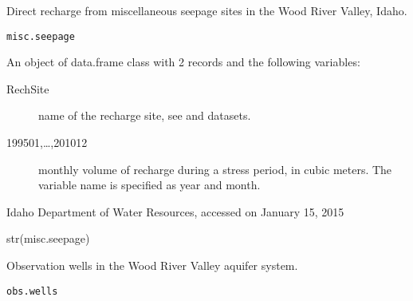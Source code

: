 \documentclass[a4paper]{book}
\begin{document}
%
\begin{Description}\relax
Direct recharge from miscellaneous seepage sites in the Wood River Valley, Idaho.
\end{Description}
%
\begin{Usage}
\begin{verbatim}
misc.seepage
\end{verbatim}
\end{Usage}
%
\begin{Format}
An object of data.frame class with 2 records and the following variables:
\begin{description}

\item[RechSite] name of the recharge site, see  and
 datasets.
\item[199501,\dots,201012] monthly volume of recharge during a stress period, in cubic meters.
The variable name is specified as year and month.

\end{description}
\end{Format}
%
\begin{Source}\relax
Idaho Department of Water Resources, accessed on January 15, 2015
\end{Source}
%
\begin{Examples}
\begin{ExampleCode}
str(misc.seepage)

\end{ExampleCode}
\end{Examples}
%
\begin{Description}\relax
Observation wells in the Wood River Valley aquifer system.
\end{Description}
%
\begin{Usage}
\begin{verbatim}
obs.wells
\end{verbatim}
\end{Usage}
%
\end{document}
